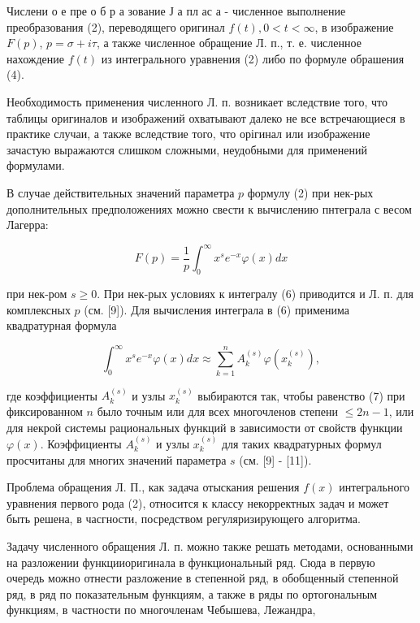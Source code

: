 \documentclass[10pt]{article}
\begin{document}
Числени о е пре о б р а зование Ј а пл ас а - численное выполнение преобразования (2), переводящего оригинал $f(t), 0<t<\infty$, в изображение $F(p)$, $p=\sigma+i \tau$, а также численное обращение Л. п., т. е. численное нахождение $f(t)$ из интегрального уравнения (2) либо по формуле обрашения (4).



Необходимость применения численного Л. п. возникает вследствие того, что таблицы оригиналов и изображений охватывают далеко не все встречающиеся в практике случаи, а также вследствие того, что орігинал или изображение зачастую выражаются слишком сложными, неудобными для применений формулами.



В случае действительных значений параметра $p$ формулу (2) при нек-рых дополнительных предположениях можно свести к вычислению пнтеграла с весом Лагерра:



\[

F(p)=\frac{1}{p} \int_{0}^{\infty} x^{s} e^{-x} \varphi(x) d x

\]



при нек-ром $s \geqslant 0$. При нек-рых условиях к интегралу (6) приводится и Л. п. для комплексных $p$ (см. [9]). Для вычисления интеграла в (6) применима квадратурная формула



\[

\int_{0}^{\infty} x^{s} e^{-x} \varphi(x) d x \approx \sum_{k=1}^{n} A_{k}^{(s)} \varphi\left(x_{k}^{(s)}\right),

\]



где коэффициенты $A_{k}^{(s)}$ и узлы $x_{k}^{(s)}$ выбираются так, чтобы равенство (7) при фиксированном $n$ было точным или для всех многочленов степени $\leqslant 2 n-1$, или для некрой системы рациональных функций в зависимости от свойств функции $\varphi(x)$. Коэффициенты $A_{k}^{(s)}$ и узлы $x_{k}^{(s)}$ для таких квадратурных формул просчитаны для многих значений параметра $s$ (см. [9] - [11]).



Проблема обращения Л. П., как задача отыскания решения $f(x)$ интегрального уравнения первого рода (2), относится к классу некорректных задач и может быть решена, в часгности, посредством регуляризирующего алгоритма.



Задачу численного обращения Л. п. можно также решать методами, основанными на разложении функцииоригинала в функциональный ряд. Сюда в первую очередь можно отнести разложение в степенной ряд, в обобщенный степенной ряд, в ряд по показательным функциям, а также в ряды по ортогональным функциям, в частности по многочленам Чебышева, Лежандра,
\end{document}
